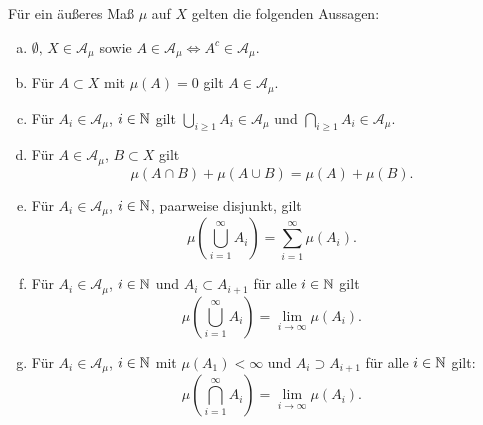 \documentclass[a4paper,twoside,DIV15,BCOR12mm]{scrbook}
\newcommand{\A}{\mathcal A}
\begin{document}
\begin{proposition}
Für ein äußeres Maß $\mu$ auf $X$ gelten die folgenden Aussagen:
\begin{enumerate}[a)]
\item $\emptyset,\, X\in \A_\mu$ sowie $A\in \A_\mu \iff A^c\in\A_\mu$.
\item Für $A\subset X$ mit $\mu(A)=0$ gilt $A\in\A_\mu$.
\item Für $A_i\in\A_\mu$, $i\in\mathbb{N}$ gilt $\bigcup_{i\ge1} A_i\in\A_\mu$ und $\bigcap_{i\ge1} A_i\in\mathcal A_\mu$.
\item Für $A\in\A_\mu$, $B\subset X$ gilt
\[
\mu(A\cap B) + \mu(A\cup B) = \mu(A) + \mu(B).
\]
\item Für $A_i\in\A_\mu$, $i\in\mathbb{N}$, paarweise disjunkt, gilt
\[
\mu(\bigcup_{i=1}^\infty A_i) = \sum_{i=1}^\infty \mu(A_i).
\]
\item Für $A_i\in \A_\mu$, $i\in\mathbb{N}$ und $A_i\subset A_{i+1}$ für alle $i\in\mathbb{N}$ gilt
\[
\mu(\bigcup_{i=1}^\infty A_i) = \lim_{i\to\infty}\mu(A_i).
\]
\item Für $A_i \in \A_\mu$, $i\in \mathbb{N}$ mit $\mu(A_1) < \infty$ und $A_i\supset A_{i+1}$ für alle $i\in\mathbb{N}$ gilt:
\[
\mu(\bigcap_{i=1}^\infty A_i) = \lim_{i\to\infty}\mu(A_i).
\]
\end{enumerate}
\end{proposition}
\end{document}
